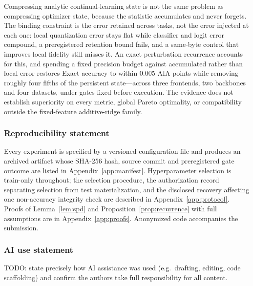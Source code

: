 \documentclass{article}
\begin{document}
Compressing analytic continual-learning state is not the same problem as
compressing optimizer state, because the statistic accumulates and never
forgets. The binding constraint is the error retained across tasks, not the
error injected at each one: local quantization error stays flat while
classifier and logit error compound, a preregistered retention bound fails, and
a same-byte control that improves local fidelity still misses it. An exact
perturbation recurrence accounts for this, and spending a fixed precision
budget against accumulated rather than local error restores Exact accuracy to
within $0.005$ AIA points while removing roughly four fifths of the persistent
state---across three frontends, two backbones and four datasets, under gates
fixed before execution. The evidence does not establish superiority on every
metric, global Pareto optimality, or compatibility outside the fixed-feature
additive-ridge family.

\subsubsection*{Reproducibility statement}
Every experiment is specified by a versioned configuration file and produces an
archived artifact whose SHA-256 hash, source commit and preregistered gate
outcome are listed in Appendix~\ref{app:manifest}. Hyperparameter selection is
train-only throughout; the selection procedure, the authorization record
separating selection from test materialization, and the disclosed recovery
affecting one non-accuracy integrity check are described in
Appendix~\ref{app:protocol}. Proofs of Lemma~\ref{lem:spd} and
Proposition~\ref{prop:recurrence} with full assumptions are in
Appendix~\ref{app:proofs}. Anonymized code accompanies the submission.

\subsubsection*{AI use statement}
TODO: state precisely how AI assistance was used (e.g.\ drafting, editing,
code scaffolding) and confirm the authors take full responsibility for all
content.




\appendix
\end{document}
